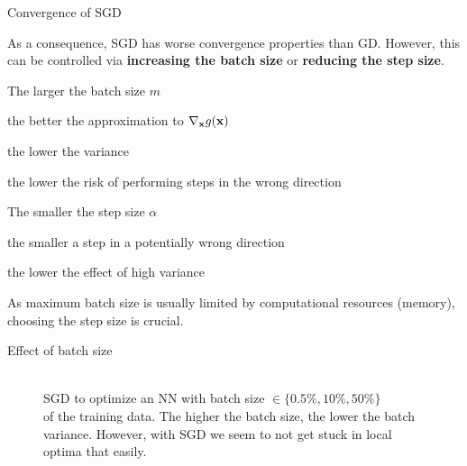 \documentclass[11pt,compress,t,notes=noshow, xcolor=table]{beamer}
\begin{document}
\begin{vbframe}{Convergence of SGD}

	As a consequence, SGD has worse convergence properties than GD. However, this can be controlled via \textbf{increasing the batch size} or \textbf{reducing the step size}. 

	\begin{blocki}{The larger the batch size $m$}
		\item the better the approximation to $\nabla_{\mathbf{x}} g(\mathbf{x})$
		\item the lower the variance
		\item the lower the risk of performing steps in the wrong direction
	\end{blocki}

	\begin{blocki}{The smaller the step size $\alpha$}
		\item the smaller a step in a potentially wrong direction 
		\item the lower the effect of high variance
	\end{blocki}


As maximum batch size is usually limited by computational resources (memory), choosing the step size is crucial. 

\end{vbframe}

\begin{vbframe}{Effect of batch size}

\begin{figure}
     \\
    SGD to optimize an NN with batch size $\in \{0.5 \%, 10 \%, 50 \%\}$ \\ of the training data. 
    The higher the batch size, the lower the batch variance. However, with SGD we seem to not get stuck in local optima that easily.
\end{figure} 

\end{vbframe}


\endlecture
\end{document}
